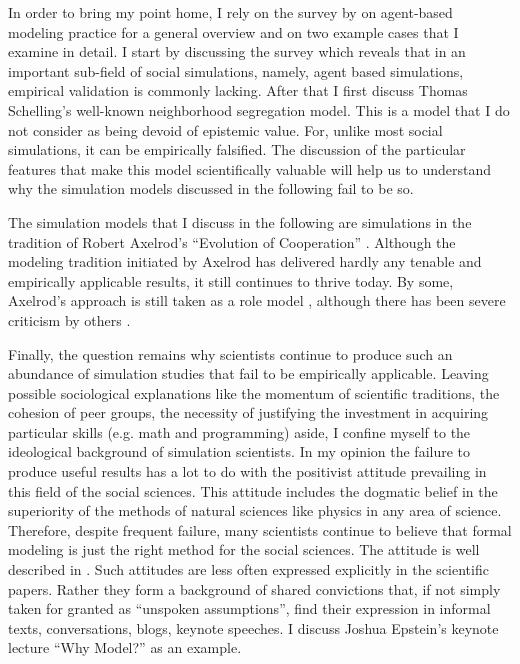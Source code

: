 \documentclass[12pt, english, a4paper]{article}
\begin{document}
In order to bring my point home, I rely on the survey by
\citet{heath-et-al:2009} on agent-based modeling practice for a
general overview and on two example cases that I examine in detail. I
start by discussing the survey which reveals that in an important
sub-field of social simulations, namely, agent based simulations,
empirical validation is commonly lacking. After that I first discuss
Thomas Schelling’s well-known neighborhood segregation model. This is
a model that I do not consider as being devoid of epistemic
value. For, unlike most social simulations, it can be empirically
falsified. The discussion of the particular features that make this
model scientifically valuable will help us to understand why the
simulation models discussed in the following fail to be so.

The simulation models that I discuss in the following are simulations
in the tradition of Robert Axelrod’s “Evolution of Cooperation”
\citep{axelrod:1984}. Although the modeling tradition initiated by
Axelrod has delivered hardly any tenable and empirically applicable
results, it still continues to thrive today. By some, Axelrod’s
approach is still taken as a role model
\citep[208-209]{rendell-et-al:2010a}, although there has been severe
criticism by others \citep{arnold:2008, binmore:1994, binmore:1998}.

Finally, the question remains why scientists continue to produce such
an abundance of simulation studies that fail to be empirically
applicable. Leaving possible sociological explanations like the
momentum of scientific traditions, the cohesion of peer groups, the
necessity of justifying the investment in acquiring particular skills
(e.g. math and programming) aside, I confine myself to the ideological
background of simulation scientists. In my opinion the failure to
produce useful results has a lot to do with the positivist attitude
prevailing in this field of the social sciences. This attitude
includes the dogmatic belief in the superiority of the methods of
natural sciences like physics in any area of science. Therefore,
despite frequent failure, many scientists continue to believe that
formal modeling is just the right method for the social sciences. The
attitude is well described in \citet{shapiro:2005}. Such attitudes are
less often expressed explicitly in the scientific papers. Rather they
form a background of shared convictions that, if not simply taken for
granted as “unspoken assumptions”, find their expression in informal
texts, conversations, blogs, keynote speeches. I discuss Joshua
Epstein’s keynote lecture “Why Model?” \citep{epstein:2008} as an
example.
\end{document}
